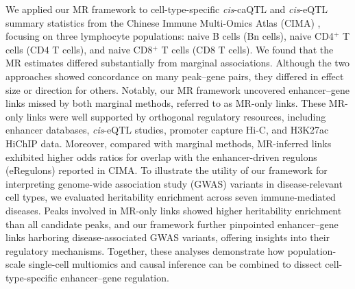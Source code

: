 \noindent We applied our MR framework to cell-type-specific \textit{cis}-caQTL and \textit{cis}-eQTL summary statistics from the Chinese Immune Multi-Omics Atlas (CIMA) \cite{yin2026cima}, focusing on three lymphocyte populations: naive B cells (Bn cells), naive CD4$^+$ T cells (CD4 T cells), and naive CD8$^+$ T cells (CD8 T cells). We found that the MR estimates differed substantially from marginal associations. Although the two approaches showed concordance on many peak--gene pairs, they differed in effect size or direction for others. Notably, our MR framework uncovered enhancer--gene links missed by both marginal methods, referred to as MR-only links. These MR-only links were well supported by orthogonal regulatory resources, including enhancer databases, \textit{cis}-eQTL studies, promoter capture Hi-C, and H3K27ac HiChIP data. Moreover, compared with marginal methods, MR-inferred links exhibited higher odds ratios for overlap with the enhancer-driven regulons (eRegulons) reported in CIMA. To illustrate the utility of our framework for interpreting genome-wide association study (GWAS) variants in disease-relevant cell types, we evaluated heritability enrichment across seven immune-mediated diseases. Peaks involved in MR-only links showed higher heritability enrichment than all candidate peaks, and our framework further pinpointed enhancer--gene links harboring disease-associated GWAS variants, offering insights into their regulatory mechanisms. Together, these analyses demonstrate how population-scale single-cell multiomics and causal inference can be combined to dissect cell-type-specific enhancer--gene regulation.
